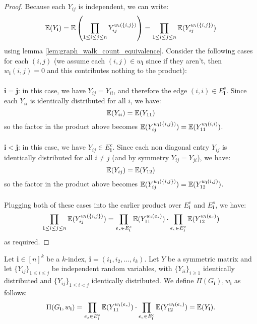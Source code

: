 \begin{proof}
\notready
Because each $Y_{ij}$ is independent, we can write:
$$
\mathbb{E}(Y_{\mathbf{i}}) = \mathbb{E}\left(\prod_{1 \leq i \leq j \leq n} Y_{ij}^{w_{\mathbf{i}}(\{i, j\})}\right) = \prod_{1 \leq i \leq j \leq n} \mathbb{E}(Y_{ij}^{w_{\mathbf{i}}(\{i, j\})})
$$
using lemma \ref{lem:graph_walk_count_equivalence}. Consider the following cases for each $(i, j)$ (we assume each $(i, j) \in w_{\mathbf{i}}$ since if they aren't, then $w_{\mathbf{i}}(i, j) = 0$ and this contributes nothing to the product):\\\\
$\mathbf{i = j}$: in this case, we have $Y_{ij} = Y_{ii}$, and therefore the edge $(i, i) \in E_{\mathbf{i}}^{s}$. Since each $Y_{ii}$ is identically distributed for all $i$, we have:
$$
\mathbb{E}(Y_{ii}) = \mathbb{E}(Y_{11})
$$
so the factor in the product above becomes $\mathbb{E}(Y_{ij}^{w_{\mathbf{i}}(\{i, j\})}) = \mathbb{E}(Y_{11}^{w_{\mathbf{i}}(i, i)})$.\\\\
$\mathbf{i < j}$: in this case, we have  $Y_{ij} \in E_{\mathbf{i}}^{c}$. Since each non diagonal entry $Y_{ij}$ is identically distributed for all $i \neq j$ (and by symmetry $Y_{ij} = Y_{ji}$), we have:
$$
\mathbb{E}(Y_{ij}) = \mathbb{E}(Y_{12})
$$
so the factor in the product above becomes $\mathbb{E}(Y_{ij}^{w_{\mathbf{i}}(\{i, j\})}) = \mathbb{E}(Y_{12}^{w_{\mathbf{i}}(i, j)})$.\\\\
Plugging both of these cases into the earlier product over $E_{\mathbf{i}}^{c}$ and $E_{\mathbf{i}}^{s}$, we have:
 $$
 \prod_{1 \leq i \leq j \leq n} \mathbb{E}(Y_{ij}^{w_{\mathbf{i}}(\{i, j\})}) = \prod_{e_s \in E_{\mathbf{i}}^s} \mathbb{E}(Y_{11}^{w_{\mathbf{i}}(e_s)}) \cdot \prod_{e_c \in E_{\mathbf{i}}^c} \mathbb{E}(Y_{12}^{w_{\mathbf{i}}(e_c)})
$$
as required.

\end{proof}

\begin{definition}
    \label{def:prod_expectation_matrix_multi_index}
    \notready
    Let $\mathbf{i} \in [n]^{k}$ be a $k$-index, $\mathbf{i} = (i_1, i_2, \ldots, i_{k})$. Let $Y$ be a symmetric matrix and let $\{Y_{ij}\}_{1\le i\le j}$ be independent random variables, with $\{Y_{ii}\}_{i\ge 1}$ identically distributed and $\{Y_{ij}\}_{1\le i<j}$ identically distributed. We define $\Pi(G_{\mathbf{i}}), w_{\mathbf{i}}$ as follows:
    $$
    \Pi (G_{\mathbf{i}}, w_{\mathbf{i}}) = \prod_{e_s \in E_{\mathbf{i}}^s} \mathbb{E}(Y_{11}^{w_{\mathbf{i}}(e_s)}) \cdot \prod_{e_c \in E_{\mathbf{i}}^c} \mathbb{E}(Y_{12}^{w_{\mathbf{i}}(e_c)}) = \mathbb{E}(Y_{\mathbf{i}}).
    $$
\end{definition}

